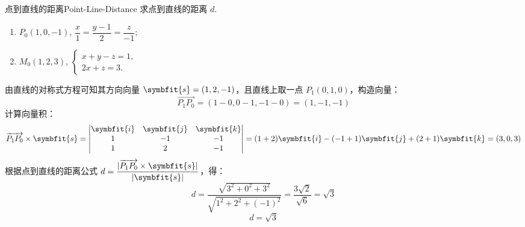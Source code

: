 \begin{problem}{点到直线的距离}{Point-Line-Distance}
    求点到直线的距离 $d$.
    \begin{enumerate}
        \item $P_0(1, 0, -1)$, $\dfrac{x}{1} = \dfrac{y-1}{2} = \dfrac{z}{-1}$;
        \item $M_0(1, 2, 3)$, $\begin{cases} x + y - z = 1, \\ 2x + z = 3. \end{cases}$
    \end{enumerate}
\end{problem}

\begin{solution}

    由直线的对称式方程可知其方向向量 $\symbfit{s} = (1, 2, -1)$，且直线上取一点 $P_1(0, 1, 0)$，构造向量：
    \begin{equation*}
        \overrightarrow{P_1P_0} = (1 - 0, 0 - 1, -1 - 0) = (1, -1, -1)
    \end{equation*}
    计算向量积：
    \begin{equation*}
        \overrightarrow{P_1P_0} \times \symbfit{s} = \begin{vmatrix} \symbfit{i} & \symbfit{j} & \symbfit{k} \\ 1 & -1 & -1 \\ 1 & 2 & -1 \end{vmatrix} = (1 + 2)\symbfit{i} - (-1 + 1)\symbfit{j} + (2 + 1)\symbfit{k} = (3, 0, 3)
    \end{equation*}
    根据点到直线的距离公式 $d = \dfrac{|\overrightarrow{P_1P_0} \times \symbfit{s}|}{|\symbfit{s}|}$，得：
    \begin{equation*}
        d = \frac{\sqrt{3^2 + 0^2 + 3^2}}{\sqrt{1^2 + 2^2 + (-1)^2}} = \frac{3\sqrt{2}}{\sqrt{6}} = \sqrt{3}
    \end{equation*}
    \begin{equation*}
        \boxed{d = \sqrt{3}}
    \end{equation*}



\end{solution}
